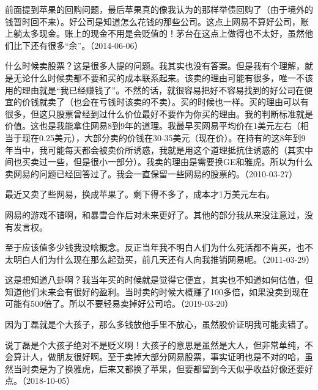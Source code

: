 前面提到苹果的回购问题，最后苹果真的像我认为的那样举债回购了（由于境外的钱暂时回不来）。好公司是知道怎么花钱的那些公司。这点上网易不算好公司，账上躺太多现金。账上的现金不用是会贬值的！茅台在这点上做得也不太好，虽然他们比下还有很多“余”。（2014-06-06）

什么时候卖股票？这是很多人提的问题。我其实也没有答案。但是我有个理解，就是无论什么时候卖都不要和买的成本联系起来。该卖的理由可能有很多，唯一不该用的理由就是“我已经赚钱了”。不然的话，就很容易把好不容易找到的好公司在便宜的价钱就卖了（也会在亏钱时该卖的不卖）。买的时候也一样。买的理由可以有很多，但这只股票曾经到过什么价位最好不要作为你买的理由。我的判断标准就是价值。这也是我能拿住网易8到9年的道理。我最早买网易平均价在1美元左右（相当于现在0.25美元），大部分卖的价钱在30-35美元（现在价）。在持有的这8年到9年当中，我可能每天都会被卖价所诱惑，我就是用这个道理抵抗住诱惑的（其实中间也买卖过一些，但是很小一部分）。我卖的理由是需要换GE和雅虎。所以为什么卖网易的问题已经回答过了。我会一直保留一些网易的股票的。（2010-03-27）


最近又卖了些网易，换成苹果了。剩下得不多了，成本才1万美元左右。

网易的游戏不错啊，和暴雪合作后对未来更好了。其他的部分我从来没注意过，没有发言权。

至于应该值多少钱我没啥概念。反正当年我不明白人们为什么死活都不肯买，也不太明白人们为什么现在那么起劲买，前几天还有人向我推销网易呢。（2011-03-29）


这是想知道八卦啊？我当年买的时候就是觉得它便宜，其实也不知道如何估值，但知道他们未来会有很好的盈利。当时卖的时候大概赚了100多倍，如果没卖到现在可能有500倍了。所以不要轻易卖掉好公司哈。（2019-03-20）


因为丁磊就是个大孩子，那么多钱放他手里不放心，虽然股价证明我可能卖错了。

说丁磊是个大孩子绝对不是贬义啊！大孩子的意思是虽然是大人，但非常单纯，不会算计人，做朋友很好啊。至于卖掉大部分网易股票，事实证明也是不对的哈，虽然当时卖是为了换雅虎，后来又都换了苹果，但要都留到今天似乎收益好像还要好点。（2018-10-05）
